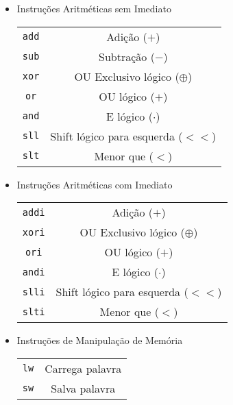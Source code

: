 \documentclass[twocolumn]{article}
\begin{document}
\begin{itemize}
\item Instruções Aritméticas sem Imediato \\
  \begin{tabular}{ c c }
    \verb|add| & \hspace*{\fill} Adição ($+$) \\
    \verb|sub| & \hspace*{\fill} Subtração ($-$) \\
    \verb|xor| & \hspace*{\fill} OU Exclusivo lógico ($\oplus$) \\
    \verb|or| & \hspace*{\fill} OU lógico ($+$) \\
    \verb|and| & \hspace*{\fill} E lógico ($\cdot$) \\
    \verb|sll| & \hspace*{\fill} Shift lógico para esquerda ($<<$) \\
    \verb|slt| & \hspace*{\fill} Menor que ($<$)
  \end{tabular}
\item Instruções Aritméticas com Imediato \\
  \begin{tabular}{ c c }
    \verb|addi| & \hspace*{\fill} Adição ($+$)\\
    \verb|xori| & \hspace*{\fill} OU Exclusivo lógico ($\oplus$) \\
    \verb|ori| & \hspace*{\fill} OU lógico ($+$) \\
    \verb|andi| & \hspace*{\fill} E lógico ($\cdot$) \\
    \verb|slli| & \hspace*{\fill} Shift lógico para esquerda ($<<$)\\
    \verb|slti| & \hspace*{\fill} Menor que ($<$)
  \end{tabular}
\item Instruções de Manipulação de Memória \\
  \begin{tabular}{ c c }
    \verb|lw| & \hspace*{\fill} Carrega palavra \\
    \verb|sw| & \hspace*{\fill} Salva palavra

\end{tabular}
\end{itemize}
\end{document}
